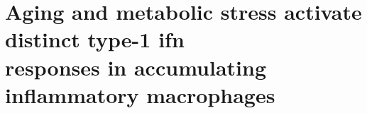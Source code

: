 
\section[Aging and metabolic stress activate distinct type-1 \glsentryshort{ifn} responses in accumulating inflammatory macrophages]{Aging and metabolic stress activate distinct type-1 \gls{ifn}\\responses in accumulating inflammatory macrophages}
\label{sec:chp2_sc_macs3_diff}

